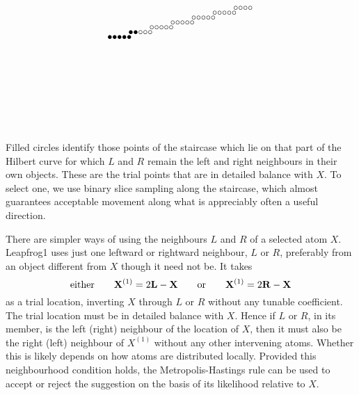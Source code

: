 $${\hskip-1.665pt \vbox{\hbox{$\bullet$ \hskip-3.335pt $\bullet$ \hskip-3.335pt $\bullet$ \hskip-3.335pt $\bullet$ \hskip-3.335pt $\bullet$} \vskip 85.4pt \hbox{ }}
\hskip-3.335pt \vbox{\hbox{$\bullet$ \hskip-3.335pt $\bullet$ \hskip-3.335pt $\circ$   \hskip-3.335pt $\circ$   \hskip-3.335pt $\circ$}   \vskip 90.4pt \hbox{ }}
\hskip-3.335pt \vbox{\hbox{$\circ$   \hskip-3.335pt $\circ$   \hskip-3.335pt $\circ$   \hskip-3.335pt $\circ$   \hskip-3.335pt $\circ$}   \vskip 95.4pt \hbox{ }}
\hskip-3.335pt \vbox{\hbox{$\circ$   \hskip-3.335pt $\circ$   \hskip-3.335pt $\circ$   \hskip-3.335pt $\circ$   \hskip-3.335pt $\circ$}   \vskip100.4pt \hbox{ }}
\hskip-3.335pt \vbox{\hbox{$\circ$   \hskip-3.335pt $\circ$   \hskip-3.335pt $\circ$   \hskip-3.335pt $\circ$   \hskip-3.335pt $\circ$}   \vskip105.4pt \hbox{ }}
\hskip-3.335pt \vbox{\hbox{$\circ$   \hskip-3.335pt $\circ$   \hskip-3.335pt $\circ$   \hskip-3.335pt $\circ$   \hskip-3.335pt $\circ$}   \vskip110.4pt \hbox{ }}
\hskip-3.335pt \vbox{\hbox{$\circ$   \hskip-3.335pt $\circ$   \hskip-3.335pt $\circ$   \hskip-3.335pt $\circ$}                            \vskip115.4pt \hbox{ }}
}  
$$
Filled circles identify those points of the staircase which lie on that part of the Hilbert curve for which 
$L$ and $R$ remain the left and right neighbours in their own objects.
These are the trial points that are in detailed balance with $X$.
To select one, we use binary slice sampling along the staircase, which almost guarantees acceptable movement along what is appreciably often a useful direction.

\vfill\eject
{}
\smallskip

There are simpler ways of using the neighbours $L$ and $R$ of a selected atom $X$.
Leapfrog1 uses just one leftward or rightward neighbour, $L$ or $R$, preferably from an object different from $X$ though it need not be.
It takes
$$
   {\rm either} \qquad {\bf X}^{(1)} = 2{\bf L} - {\bf X} \qquad {\rm or} \qquad {\bf X}^{(1)} = 2{\bf R} - {\bf X}
$$
as a trial location, inverting $X$ through $L$ or $R$ without any tunable coefficient.
The trial location must be in detailed balance with $X$.
Hence if $L$ or $R$, in its member, is the left (right) neighbour of the location of $X$, 
then it must also be the right (left) neighbour of $X^{(1)}$ without any other intervening atoms.
Whether this is likely depends on how atoms are distributed locally.
Provided this neighbourhood condition holds, 
the Metropolis-Hastings rule can be used to accept or reject the suggestion on the basis of its likelihood relative to $X$.

